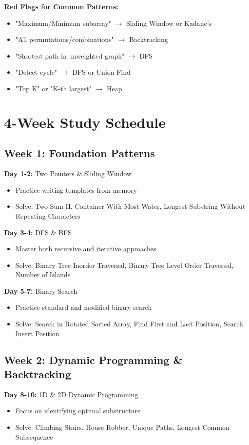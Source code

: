 \documentclass[10pt,a4paper]{article}
\begin{document}
\begin{tipbox}
\textbf{Red Flags for Common Patterns:}
\begin{itemize}
\item "Maximum/Minimum subarray" $\rightarrow$ Sliding Window or Kadane's
\item "All permutations/combinations" $\rightarrow$ Backtracking
\item "Shortest path in unweighted graph" $\rightarrow$ BFS
\item "Detect cycle" $\rightarrow$ DFS or Union-Find
\item "Top K" or "K-th largest" $\rightarrow$ Heap
\end{itemize}
\end{tipbox}

\section{4-Week Study Schedule}

\subsection{Week 1: Foundation Patterns}
\textbf{Day 1-2:} Two Pointers \& Sliding Window
\begin{itemize}
\item Practice writing templates from memory
\item Solve: Two Sum II, Container With Most Water, Longest Substring Without Repeating Characters
\end{itemize}

\textbf{Day 3-4:} DFS \& BFS
\begin{itemize}
\item Master both recursive and iterative approaches
\item Solve: Binary Tree Inorder Traversal, Binary Tree Level Order Traversal, Number of Islands
\end{itemize}

\textbf{Day 5-7:} Binary Search
\begin{itemize}
\item Practice standard and modified binary search
\item Solve: Search in Rotated Sorted Array, Find First and Last Position, Search Insert Position
\end{itemize}

\subsection{Week 2: Dynamic Programming \& Backtracking}
\textbf{Day 8-10:} 1D \& 2D Dynamic Programming
\begin{itemize}
\item Focus on identifying optimal substructure
\item Solve: Climbing Stairs, House Robber, Unique Paths, Longest Common Subsequence
\end{itemize}
\end{document}
